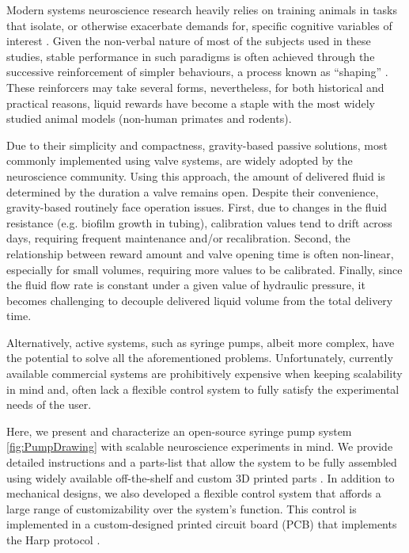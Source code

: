 Modern systems neuroscience research heavily relies on training animals in tasks that isolate, or otherwise exacerbate demands for, specific cognitive variables of interest \citep{Gomez-Marin2016}. Given the non-verbal nature of most of the subjects used in these studies, stable performance in such paradigms is often achieved through the successive reinforcement of simpler behaviours, a process known as “shaping” \citep{Jones1939}. These reinforcers may take several forms, nevertheless, for both historical and practical reasons, liquid rewards have become a staple with the most widely studied animal models (non-human primates and rodents)\citep{Guo2014}. 

Due to their simplicity and compactness, gravity-based passive solutions, most commonly implemented using valve systems, are widely adopted by the neuroscience community. Using this approach, the amount of delivered fluid is determined by the duration a valve remains open. Despite their convenience, gravity-based routinely face operation issues. First, due to changes in the fluid resistance (e.g. biofilm growth in tubing), calibration values tend to drift across days, requiring frequent maintenance and/or recalibration. Second, the relationship between reward amount and valve opening time is often non-linear, especially for small volumes, requiring more values to be calibrated. Finally, since the fluid flow rate is constant under a given value of hydraulic pressure, it becomes challenging to decouple delivered liquid volume from the total delivery time.

Alternatively, active systems, such as syringe pumps, albeit more complex, have the potential to solve all the aforementioned problems. Unfortunately, currently available commercial systems are prohibitively expensive when keeping scalability in mind and, often lack a flexible control system to fully satisfy the experimental needs of the user.

Here, we present and characterize an open-source syringe pump system \ref{fig:PumpDrawing} with scalable neuroscience experiments in mind. We provide detailed instructions and a parts-list that allow the system to be fully assembled using widely available off-the-shelf and custom 3D printed parts . 
In addition to mechanical designs, we also developed a flexible control system that affords a large range of customizability over the system's function. This control is implemented in a custom-designed printed circuit board (PCB) that implements the Harp protocol .

